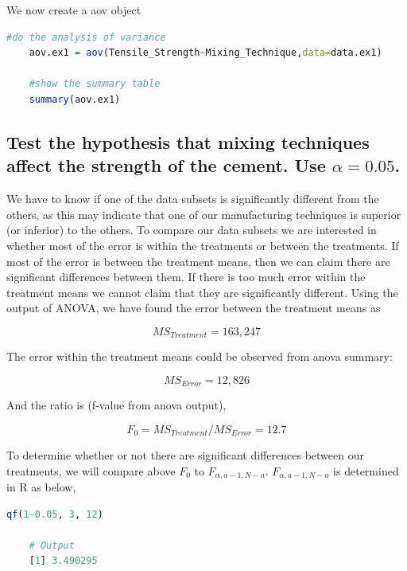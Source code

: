 \documentclass[11pt]{article}
\begin{document}
\clearpage



We now create a aov object

\begin{lstlisting}[language=R]
    #do the analysis of variance
    aov.ex1 = aov(Tensile_Strength~Mixing_Technique,data=data.ex1)

    #show the summary table
    summary(aov.ex1)
\end{lstlisting}



\subsection{Test the hypothesis that mixing techniques affect the strength of the cement. Use $\displaystyle \alpha=0.05$.}
We have to know if one of the data subsets is significantly different from the others, as this may indicate that one of our manufacturing techniques is superior (or inferior) to the others. To compare our data subsets we are interested in whether most of the error is within the treatments or between the treatments. If most of the error is between the treatment means, then we can claim there are significant differences between them. If there is too much error within the treatment means we cannot claim that they are significantly different. Using the output of ANOVA, we have found the error between the treatment means as 

$$\displaystyle MS_{Treatment} = 163,247$$

The error within the treatment means could be observed from anova summary: 

$$\displaystyle MS_{Error} = 12,826$$

And the ratio is (f-value from anova output),

$$\displaystyle F_0 = MS_{Treatment}/MS_{Error} = 12.7$$

To determine whether or not there are significant differences between our treatments, we will compare above $\displaystyle F_0$ to $\displaystyle F_{\alpha, a-1, N-a}$. $\displaystyle F_{\alpha, a-1, N-a}$ is determined in R as below,

\begin{lstlisting}[language=R]
    qf(1-0.05, 3, 12)   

    # Output
    [1] 3.490295
\end{lstlisting}
\end{document}
